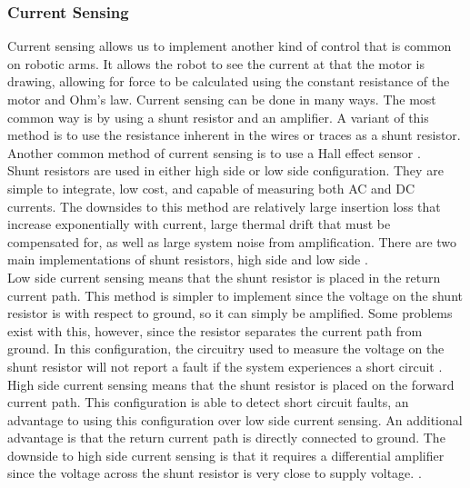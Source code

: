 \subsubsection{Current Sensing}
Current sensing allows us to implement another kind of control that is common on robotic arms. It allows the robot to see the current at that the motor is drawing, allowing for force to be calculated using the constant resistance of the motor and Ohm's law. Current sensing can be done in many ways. The most common way is by using a shunt resistor and an amplifier. A variant of this method is to use the resistance inherent in the wires or traces as a shunt resistor. Another common method of current sensing is to use a Hall effect sensor \cite{Current_Sensing}. \\
\newline
Shunt resistors are used in either high side or low side configuration. They are simple to integrate, low cost, and capable of measuring both AC and DC currents. The downsides to this method are relatively large insertion loss that increase exponentially with current, large thermal drift that must be compensated for, as well as large system noise from amplification. There are two main implementations of shunt resistors, high side and low side \cite{Current_Sensing}. \\
\newline
Low side current sensing means that the shunt resistor is placed in the return current path. This method is simpler to implement since the voltage on the shunt resistor is with respect to ground, so it can simply be amplified. Some problems exist with this, however, since the resistor separates the current path from ground. In this configuration, the circuitry used to measure the voltage on the shunt resistor will not report a fault if the system experiences a short circuit \cite{Current_Sensing}. \\
\newline 
High side current sensing means that the shunt resistor is placed on the forward current path. This configuration is able to detect short circuit faults, an advantage to using this configuration over low side current sensing. An additional advantage is that the return current path is directly connected to ground. The downside to high side current sensing is that it requires a differential amplifier since the voltage across the shunt resistor is very close to supply voltage. \cite{Current_Sensing}. \\
\newline
